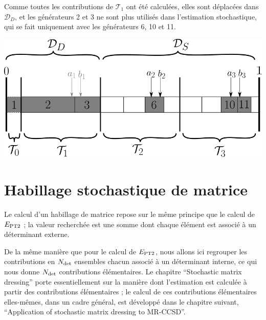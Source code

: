 \documentclass[./thesis.tex]{subfiles}
\begin{document}
Comme toutes les contributions de $\mathcal{T}_1$ ont été calculées, elles sont déplacées dans $\mathcal{D}_D$, et les générateurs 2 et 3 ne sont plus utilisés dans l'estimation stochastique, qui se fait uniquement avec les générateurs 6, 10 et 11.
        \begin{center}
                \includegraphics[width=0.75\columnwidth]{figures/pt2/toothindet}
        \end{center}
\section{Habillage stochastique de matrice}
Le calcul d'un habillage de matrice repose sur le même principe que le calcul de $E_\text{PT2}$ ; la valeur recherchée est une somme dont chaque élément est associé à un déterminant externe. 

De la même manière que pour le calcul de $E_\text{PT2}$, nous allons ici regrouper les contributions en ${N_\text{det}}$ ensembles chacun associé à un déterminant interne, ce qui nous donne ${N_\text{det}}$ contributions élémentaires.
Le chapitre ``Stochastic matrix dressing'' porte essentiellement sur la manière dont l'estimation est calculée à partir des contributions élémentaires ; le calcul de ces contributions élémentaires elles-mêmes, dans un cadre général, est développé dans le chapitre suivant, ``Application of stochastic matrix dressing to MR-CCSD''.
\end{document}
